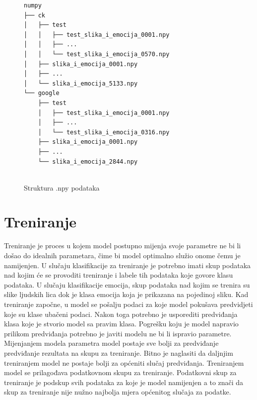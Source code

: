 \documentclass[times, utf8, zavrsni,numeric,pstricks]{fer}
\begin{document}
\begin{figure}[H]
\centering
\begin{Verbatim}[fontsize=\small]
numpy
├── ck
│   ├── test
│   │	├── test_slika_i_emocija_0001.npy
│   │	├── ...
│   │	└── test_slika_i_emocija_0570.npy
│   ├── slika_i_emocija_0001.npy
│   ├── ...
│   └── slika_i_emocija_5133.npy
└── google
    ├── test
    │	├── test_slika_i_emocija_0001.npy
	│	├── ...
	│	└── test_slika_i_emocija_0316.npy
    ├── slika_i_emocija_0001.npy
    ├── ...
    └── slika_i_emocija_2844.npy
    

\end{Verbatim}
\caption{Struktura .npy podataka}
\label{pic:npy_structure}
\end{figure}



\chapter{Treniranje}
Treniranje je proces u kojem model postupno mijenja svoje parametre ne bi li došao do idealnih parametara, čime bi model optimalno služio onome čemu je namijenjen. U slučaju klasifikacije za treniranje je potrebno imati skup podataka nad kojim će se provoditi treniranje i labele tih podataka koje govore klasu podataka. U slučaju klasifikacije emocija, skup podataka nad kojim se trenira su slike ljudskih lica dok je klasa emocija koja je prikazana na pojedinoj sliku. Kad treniranje započne, u model se pošalju podaci za koje model pokušava predvidjeti koje su klase ubačeni podaci. Nakon toga potrebno je usporediti predviđanja klasa koje je stvorio model sa pravim klasa. Pogrešku koju je model napravio prilikom predviđanja potrebno je javiti modelu ne bi li ispravio parametre. Mijenjanjem modela parametra model postaje sve bolji za predviđanje predviđanje rezultata na skupu za treniranje. Bitno je naglasiti da daljnjim treniranjem model ne postaje bolji za općeniti slučaj predviđanja. Treniranjem model se prilagođava podatkovnom skupu za treniranje. Podatkovni skup za treniranje je podskup svih podataka za koje je model namijenjen a to znači da skup za treniranje nije nužno najbolja mjera općenitog slučaja za podatke. 
\end{document}
